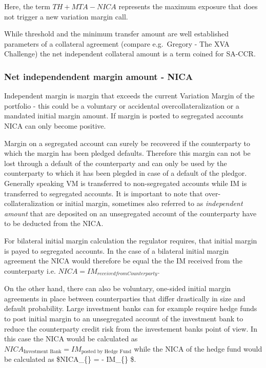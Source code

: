 \documentclass[11pt]{article}
\begin{document}
Here, the term \(TH+MTA-NICA\) represents the maximum exposure that does
not trigger a new variation margin call.

While threshold and the minimum transfer amount are well established
parameters of a collateral agreement (compare e.g.~Gregory - The XVA
Challenge) the net independent collateral amount is a term coined for
SA-CCR.

\hypertarget{net-independendent-margin-amount---nica}{%
\subsubsection{Net independendent margin amount -
NICA}\label{net-independendent-margin-amount---nica}}

Independent margin is margin that exceeds the current Variation Margin
of the portfolio - this could be a voluntary or accidental
overcollateralization or a mandated initial margin amount. If margin is
posted to segregated accounts NICA can only become positive.

Margin on a segregated account can surely be recovered if the
counterparty to which the margin has been pledged defaults. Therefore
this margin can not be lost through a default of the counterparty and
can only be used by the counterparty to which it has been plegded in
case of a default of the pledgor. Generally speaking VM is transferred
to non-segregated accounts while IM is transferred to segregated
accounts. It is important to note that over-collateralization or initial
margin, sometimes also referred to as \emph{independent amount} that are
deposited on an unsegregated account of the counterparty have to be
deducted from the NICA.

For bilateral initial margin calculation the regulator requires, that
initial margin is payed to segregated accounts. In the case of a
bilateral initial margin agreement the NICA would therefore be equal the
the IM received from the counterparty i.e.
\(NICA = IM_{received from Counterparty}\).

On the other hand, there can also be voluntary, one-sided initial margin
agreements in place between counterparties that differ drastically in
size and default probability. Large investment banks can for example
require hedge funds to post initial margin to an unsegregated account of
the investment bank to reduce the counterparty credit risk from the
investement banks point of view. In this case the NICA would be
calculated as
\(NICA_{\text{Investment Bank}} = IM_{\text{posted by Hedge Fund}}\)
while the NICA of the hedge fund would be calculated as
\$NICA\_\{\} = - IM\_\{\}
\$.
\end{document}
